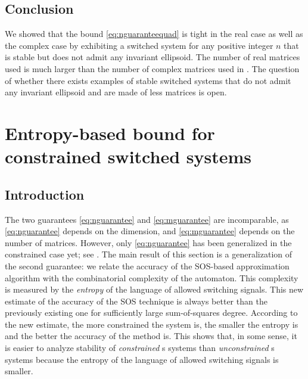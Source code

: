 \documentclass[11pt,twoside,a4paper,openright]{uclouvain-thesis}
\begin{document}
\subsection{Conclusion}
We showed that the bound \eqref{eq:nguaranteequad} is tight
in the real case as well as the complex case by exhibiting a switched system for any positive integer $n$ that is stable
but does not admit any invariant ellipsoid.
The number of real matrices used is much larger than
the number of complex matrices used in \cite{ando1998simultaneous}.
The question of whether there exists examples of stable switched systems
that do not admit any invariant ellipsoid and are made of
less matrices is open.

\section{Entropy-based bound for constrained switched systems}
\label{sec:entropyguarantee}

\subsection{Introduction}

The two guarantees \eqref{eq:nguarantee} and \eqref{eq:mguarantee} are incomparable,
as \eqref{eq:nguarantee} depends on the dimension,
and \eqref{eq:mguarantee} depends on the number of matrices.
However, only \eqref{eq:nguarantee} has been generalized in the constrained case yet; see .
The main result of this section is a generalization of the second guarantee: we relate the accuracy
of the SOS-based approximation algorithm with the combinatorial complexity of the automaton.
This complexity is measured by the \emph{entropy} of the language of allowed switching signals.
This new estimate of the accuracy of the SOS technique is always better than the previously existing one for sufficiently large sum-of-squares degree.
According to the new estimate, the more constrained the system is, the smaller the entropy is and the better the accuracy of the method is.
This shows that, in some sense, it is easier to analyze stability of \emph{constrained} s\witch{} systems than \emph{unconstrained} s\witch{} systems
because the entropy of the language of allowed switching signals is smaller.
\end{document}
